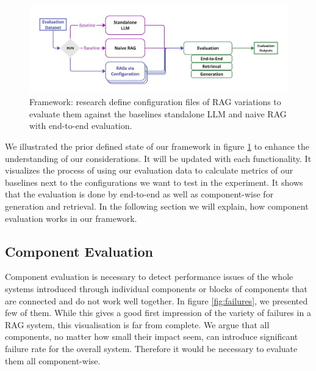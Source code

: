 \begin{figure}[h]
  \centering
  \includegraphics[width=\textwidth]{images/FrameworkBaselines.pdf}
  \caption{Framework: research define configuration files of RAG variations to evaluate them against the baselines standalone LLM and naive RAG with end-to-end evaluation.}
  \label{fig:framework-baselines}
\end{figure}

We illustrated the prior defined state of our framework in figure \ref{fig:framework-baselines} to enhance the understanding of our considerations. It will be updated with each functionality. It visualizes the process of using our evaluation data to calculate metrics of our baselines next to the configurations we want to test in the experiment. It shows that the evaluation is done by end-to-end as well as component-wise for generation and retrieval. In the following section we will explain, how component evaluation works in our framework.


\subsection{Component Evaluation}

Component evaluation is necessary to detect performance issues of the whole systems introduced through individual components or blocks of components that are connected and do not work well together.\cite{Salemi.2024} In figure \ref{fig:failures}, we presented few of them. While this gives a good first impression of the variety of failures in a RAG system, this visualisation is far from complete. We argue that all components, no matter how small their impact seem, can introduce significant failure rate for the overall system. Therefore it would be necessary to evaluate them all component-wise. 

